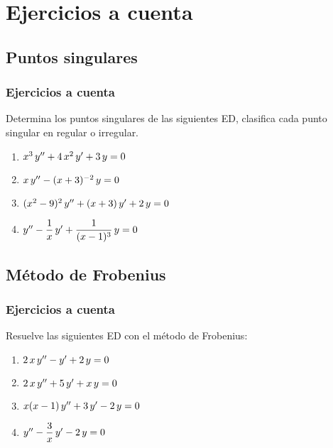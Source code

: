 \documentclass[12pt]{beamer}
\begin{document}
\section{Ejercicios a cuenta}
\subsection{Puntos singulares}

\begin{frame}
\frametitle{Ejercicios a cuenta}
Determina los puntos singulares de las siguientes ED, clasifica cada punto singular en regular o irregular.
\begin{enumerate}
\item $x^{3} \, {y}^{\prime \prime} + 4 \, x^{2} \, {y}^{\prime} + 3 \, y = 0$
\item $x \, {y}^{\prime \prime} - (x + 3)^{-2} \, y = 0$
\item $(x^{2} - 9)^{2} \, {y}^{\prime \prime} + (x + 3) \, {y}^{\prime} + 2 \, y = 0$
\item ${y}^{\prime \prime} - \dfrac{1}{x} \, {y}^{\prime} + \dfrac{1}{(x - 1)^{3}} \, y = 0$
\end{enumerate}
\end{frame}

\subsection{Método de Frobenius}

\begin{frame}
\frametitle{Ejercicios a cuenta}
Resuelve las siguientes ED con el método de Frobenius:
\begin{enumerate}
\item $2 \, x \, {y}^{\prime \prime} - {y}^{\prime} + 2 \, y = 0$
\item $2 \, x \, {y}^{\prime \prime} + 5 \, {y}^{\prime} + x \, y = 0$
\item $x (x - 1) \, {y}^{\prime \prime} + 3 \, {y}^{\prime} - 2 \, y = 0$
\item ${y}^{\prime \prime} - \dfrac{3}{x} \, {y}^{\prime} - 2 \, y = 0$
\end{enumerate}
\end{frame}
\end{document}
